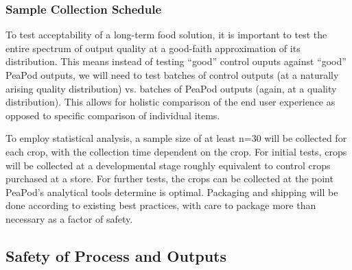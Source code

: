 
\subsubsection{Sample Collection Schedule}


To test acceptability of a long-term food solution, it is important to test the entire spectrum of output quality at a good-faith approximation of its distribution. This means instead of testing ``good'' control ouputs against ``good'' PeaPod outputs, we will need to test batches of control outputs (at a naturally arising quality distribution) vs. batches of PeaPod outputs (again, at a quality distribution). This allows for holistic comparison of the end user experience as opposed to specific comparison of individual items.

To employ statistical analysis, a sample size of at least n=30 will be collected for each crop, with the collection time dependent on the crop. For initial tests, crops will be collected at a developmental stage roughly equivalent to control crops purchased at a store. For further tests, the crops can be collected at the point PeaPod's analytical tools determine is optimal. Packaging and shipping will be done according to existing best practices, with care to package more than necessary as a factor of safety. 



\clearpage

\subsection{Safety of Process and Outputs}


